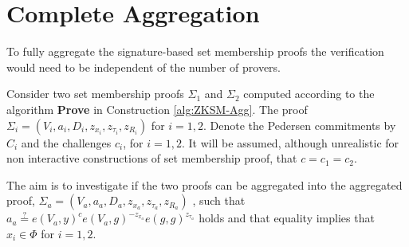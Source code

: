 \chapter{Complete Aggregation }
\label{appendix:aggregate_a}
To fully aggregate the signature-based set membership proofs the verification would need to be independent of the number of provers. 

Consider two set membership proofs $\Sigma_1$ and $\Sigma_2$ computed according to the algorithm \textbf{Prove} in Construction \ref{alg:ZKSM-Agg}. The proof $\Sigma_i = (V_i,a_i,D_i,z_{x_i},z_{\tau_i},z_{R_i})$ for $i=1,2$. Denote the Pedersen commitments by $C_i$ and the challenges $c_i$, for $i=1,2$.
It will be assumed, although unrealistic for non interactive constructions of set membership proof, that $c=c_1=c_2$.

The aim is to investigate if the two proofs can be aggregated into the aggregated proof, $\Sigma_a=(V_a,a_a,D_a,z_{x_a}, z_{\tau_a}, z_{R_a})$ , such that $a_a \overset{?}{=} e(V_a,y)^c e(V_a,g)^{-z_{x_a}}e(g,g)^{z_{\tau_a}}$ holds and that equality implies that $x_i\in\Phi$ for $i=1,2$. 

